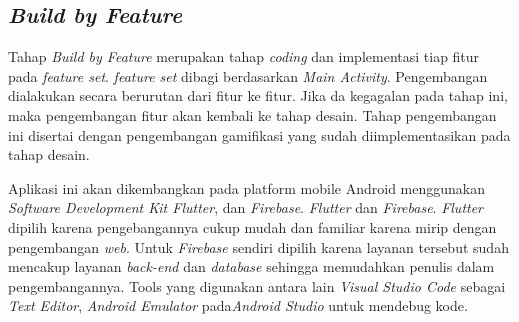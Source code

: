 \subsection{\textit{Build by Feature}}
Tahap \textit{Build by Feature} merupakan tahap \textit{coding} dan implementasi tiap fitur pada \textit{feature set}.
\textit{feature set} dibagi berdasarkan \textit{Main Activity}. Pengembangan dialakukan secara berurutan dari fitur ke fitur.
Jika da kegagalan pada tahap ini, maka pengembangan fitur akan kembali ke tahap desain.
Tahap pengembangan ini disertai dengan pengembangan gamifikasi yang sudah diimplementasikan pada tahap desain.

Aplikasi ini akan dikembangkan pada platform mobile Android menggunakan \textit{Software Development Kit Flutter}, dan \textit{Firebase}.
\textit{Flutter} dan \textit{Firebase}. \textit{Flutter} dipilih karena pengebangannya cukup mudah dan familiar karena mirip dengan pengembangan \textit{web}.
Untuk \textit{Firebase} sendiri dipilih karena layanan tersebut sudah mencakup layanan \textit{back-end} dan \textit{database} sehingga memudahkan penulis dalam pengembangannya.
Tools yang digunakan antara lain \textit{Visual Studio Code} sebagai \textit{Text Editor}, \textit{Android Emulator} pada\textit{Android Studio} untuk mendebug kode.
